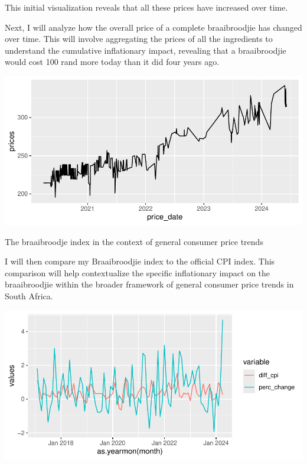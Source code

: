 \documentclass[11pt,preprint, authoryear]{elsarticle}
\let\origfigure\figure
\let\endorigfigure\endfigure
\renewenvironment{figure}[1][2] {
    \expandafter\origfigure\expandafter[H]
} {
    \endorigfigure
}
\numberwithin{equation}{section}
\numberwithin{figure}{section}
\numberwithin{table}{section}
\begin{document}
This initial visualization reveals that all these prices have increased
over time.

Next, I will analyze how the overall price of a complete braaibroodjie
has changed over time. This will involve aggregating the prices of all
the ingredients to understand the cumulative inflationary impact,
revealing that a braaibroodjie would cost 100 rand more today than it
did four years ago.

\begin{figure}[H]

{\centering \includegraphics{Question5_files/figure-latex/Figure 2-1} 

}

\caption{Cost of producing a Braaibroodje over time \label{Figure1}}\label{fig:Figure 2}
\end{figure}

The braaibroodje index in the context of general consumer price trends
\label{Meth}

I will then compare my Braaibroodjie index to the official CPI index.
This comparison will help contextualize the specific inflationary impact
on the braaibroodjie within the broader framework of general consumer
price trends in South Africa.

\begin{figure}[H]

{\centering \includegraphics{Question5_files/figure-latex/Figure 3-1} 

}

\caption{Accuracy of the braaibrodje index \label{Figure1}}\label{fig:Figure 3}
\end{figure}
\end{document}
